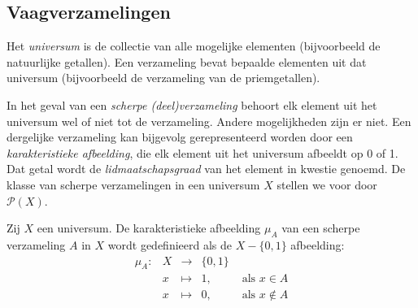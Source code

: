 
\subsection{Vaagverzamelingen}

Het \emph{universum} is de collectie van alle mogelijke elementen (bijvoorbeeld de
natuurlijke getallen). Een verzameling bevat bepaalde elementen uit dat universum (bijvoorbeeld de 
verzameling van de priemgetallen). 

In het geval van een \emph{scherpe (deel)verzameling} behoort elk 
element uit het universum wel of niet tot de verzameling. Andere mogelijkheden zijn er
niet. Een dergelijke verzameling kan bijgevolg 
gerepresenteerd worden door een \emph{karakteristieke afbeelding}, die elk element uit het 
universum afbeeldt op 0 of 1. Dat getal wordt de \emph{lidmaatschapsgraad} van het element 
in kwestie genoemd. De klasse van scherpe verzamelingen in een universum $X$ stellen we voor door 
$\mathcal{P}(X)$.
\begin{definitie}
Zij $X$ een universum. De karakteristieke afbeelding $\mu_A$ van een scherpe verzameling $A$ in $X$
wordt gedefinieerd als de $X - \{0,1\}$ afbeelding:
\begin{displaymath}
\begin{array}{lllll}
\mu_A: 	& X & \to 		& \{0,1\}	& \\
		& x & \mapsto 	& 1,		& \textrm{ als } x \in A \\
		& x & \mapsto 	& 0,		& \textrm{ als } x \notin A
\end{array}
\end{displaymath}
\end{definitie}

